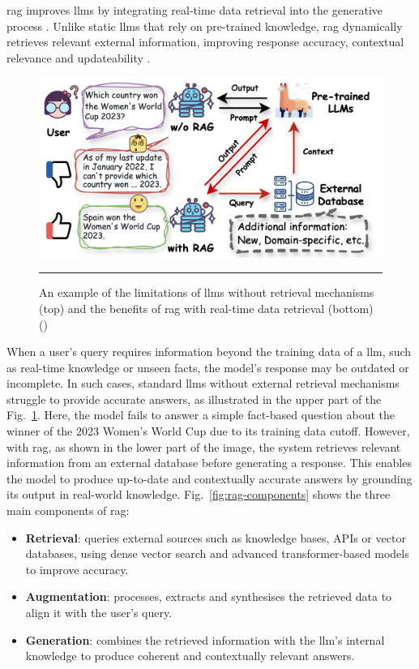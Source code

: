 \acrfull{rag} improves \glspl{llm} by integrating real-time data retrieval into the generative process \cite{singh2025}.
Unlike static \glspl{llm} that rely on pre-trained knowledge, \gls{rag} dynamically retrieves relevant external information, improving response accuracy, contextual relevance and updateability \cite{Fan2024, singh2025}.

\begin{figure}[htbp]
  \centering
\includegraphics[width=.7\textwidth]{figures/literature-review/rag-no-rag-example.png}
   \rule{35em}{0.5pt}
  \caption{An example of the limitations of \glspl{llm} without retrieval mechanisms (top) and the benefits of \gls{rag} with real-time data retrieval (bottom) (\textcite{Fan2024})}
\label{fig:rag-no-rag-example}
\end{figure}

When a user's query requires information beyond the training data of a \gls{llm}, such as real-time knowledge or unseen facts, the model's response may be outdated or incomplete.
In such cases, standard \glspl{llm} without external retrieval mechanisms struggle to provide accurate answers, as illustrated in the upper part of the Fig.~\ref{fig:rag-no-rag-example}.
Here, the model fails to answer a simple fact-based question about the winner of the 2023 Women's World Cup due to its training data cutoff.
However, with \gls{rag}, as shown in the lower part of the image, the system retrieves relevant information from an external database before generating a response.
This enables the model to produce up-to-date and contextually accurate answers by grounding its output in real-world knowledge.
Fig.~\ref{fig:rag-components} shows the three main components of \gls{rag}:
\begin{itemize}
    \item \textbf{Retrieval}: queries external sources such as knowledge bases, APIs or vector databases, using dense vector search and advanced transformer-based models to improve accuracy.
    \item \textbf{Augmentation}: processes, extracts and synthesises the retrieved data to align it with the user's query.
    \item \textbf{Generation}: combines the retrieved information with the \gls{llm}'s internal knowledge to produce coherent and contextually relevant answers. 
\end{itemize}
	
